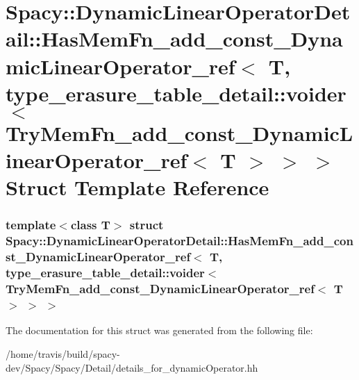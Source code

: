 \hypertarget{structSpacy_1_1DynamicLinearOperatorDetail_1_1HasMemFn__add__const__DynamicLinearOperator__ref_371e86621f8dbae15fa11b0d4b0794581}{\section{\-Spacy\-:\-:\-Dynamic\-Linear\-Operator\-Detail\-:\-:\-Has\-Mem\-Fn\-\_\-add\-\_\-const\-\_\-\-Dynamic\-Linear\-Operator\-\_\-ref$<$ \-T, type\-\_\-erasure\-\_\-table\-\_\-detail\-:\-:voider$<$ \-Try\-Mem\-Fn\-\_\-add\-\_\-const\-\_\-\-Dynamic\-Linear\-Operator\-\_\-ref$<$ \-T $>$ $>$ $>$ \-Struct \-Template \-Reference}
\label{structSpacy_1_1DynamicLinearOperatorDetail_1_1HasMemFn__add__const__DynamicLinearOperator__ref_371e86621f8dbae15fa11b0d4b0794581}
}
\subsubsection*{template$<$class T$>$ struct Spacy\-::\-Dynamic\-Linear\-Operator\-Detail\-::\-Has\-Mem\-Fn\-\_\-add\-\_\-const\-\_\-\-Dynamic\-Linear\-Operator\-\_\-ref$<$ T, type\-\_\-erasure\-\_\-table\-\_\-detail\-::voider$<$ Try\-Mem\-Fn\-\_\-add\-\_\-const\-\_\-\-Dynamic\-Linear\-Operator\-\_\-ref$<$ T $>$ $>$ $>$}



\-The documentation for this struct was generated from the following file\-:\begin{DoxyCompactItemize}
\item 
/home/travis/build/spacy-\/dev/\-Spacy/\-Spacy/\-Detail/details\-\_\-for\-\_\-dynamic\-Operator.\-hh\end{DoxyCompactItemize}
